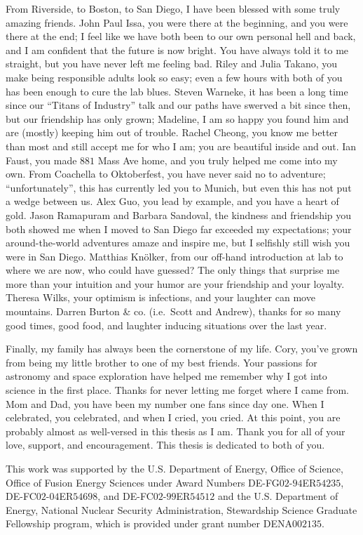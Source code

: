 From Riverside, to Boston, to San Diego,
I have been blessed with some truly amazing friends.
John Paul Issa, you were there at the beginning, and
you were there at the end;
I feel like we have both been to our own personal hell and back, and
I am confident that the future is now bright.
You have always told it to me straight, but
you have never left me feeling bad.
Riley and Julia Takano, you make being responsible adults look so easy;
even a few hours with both of you has been enough to cure the lab blues.
Steven Warneke, it has been a long time
since our ``Titans of Industry'' talk and
our paths have swerved a bit since then, but
our friendship has only grown;
Madeline, I am so happy you found him and
are (mostly) keeping him out of trouble.
Rachel Cheong, you know me better than most and
still accept me for who I am;
you are beautiful inside and out.
Ian Faust, you made $881$ Mass Ave home, and
you truly helped me come into my own.
From Coachella to Oktoberfest,
you have never said no to adventure;
``unfortunately'', this has currently led you to Munich, but
even this has not put a wedge between us.
Alex Guo, you lead by example, and
you have a heart of gold.
Jason Ramapuram and Barbara Sandoval,
the kindness and friendship you both showed me
when I moved to San Diego
far exceeded my expectations;
your around-the-world adventures amaze and inspire me, but
I selfishly still wish you were in San Diego.
Matthias Kn{\"o}lker, from our off-hand introduction at lab
to where we are now, who could have guessed?
The only things that surprise me
more than your intuition and your humor
are your friendship and your loyalty.
Theresa Wilks, your optimism is infections, and
your laughter can move mountains.
Darren Burton \& co. (i.e.\ Scott and Andrew),
thanks for so many good times, good food, and
laughter inducing situations over the last year.

Finally, my family has always been the cornerstone of my life.
Cory, you've grown from being
my little brother to one of my best friends.
Your passions for astronomy and space exploration
have helped me remember why I got into science in the first place.
Thanks for never letting me forget where I came from.
Mom and Dad, you have been my number one fans since day one.
When I celebrated, you celebrated, and when I cried, you cried.
At this point, you are probably almost as well-versed in this thesis as I am.
Thank you for all of your love, support, and encouragement.
This thesis is dedicated to both of you.

This work was supported by
the U.S. Department of Energy,
Office of Science,
Office of Fusion Energy Sciences
under Award Numbers
DE-FG$02$-$94$ER$54235$,
DE-FC$02$-$04$ER$54698$, and
DE-FC$02$-$99$ER$54512$ and
the U.S. Department of Energy,
National Nuclear Security Administration,
Stewardship Science Graduate Fellowship program,
which is provided under grant number DENA$002135$.
